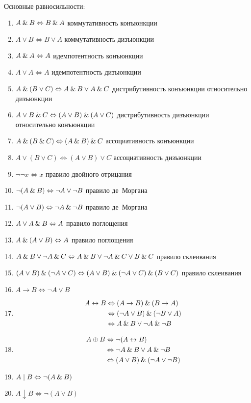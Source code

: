\documentclass[main]{subfiles}
\begin{document}
Основные равносильности:
\begin{enumerate}
    \item $A\mathbin{\&} B \Leftrightarrow B\mathbin{\&} A$ коммутативность конъюнкции
    \item $A\lor B \Leftrightarrow B\lor A$ коммутативность дизъюнкции
    \item $A\mathbin{\&} A \Leftrightarrow A$ идемпотентность конъюнкции
    \item $A\lor A \Leftrightarrow  A$ идемпотентность дизъюнкции
    \item $A\mathbin{\&}(B\lor C) \Leftrightarrow  A\mathbin{\&} B \lor A\mathbin{\&} C$ дистрибутивность конъюнкции относительно дизъюнкции
    \item $A\lor B\mathbin{\&} C  \Leftrightarrow (A\lor B)\mathbin{\&} (A\lor C)$ дистрибутивность дизъюнкции относительно конъюнкции
    \item $A\mathbin{\&} (B\mathbin{\&} C) \Leftrightarrow (A\mathbin{\&} B)\mathbin{\&} C$ ассоциативность конъюнкции
    \item $A\lor (B\lor C) \Leftrightarrow  (A\lor B)\lor C$ ассоциативность дизъюнкции
    \item $\lnot\lnot x \Leftrightarrow x$ правило двойного отрицания
    \item $\lnot(A\mathbin{\&} B) \Leftrightarrow \lnot A \lor \lnot B$ правило де~Моргана
    \item $\lnot(A\lor B) \Leftrightarrow  \lnot A \mathbin{\&} \lnot B$ правило де~Моргана
    \item $A\lor A \mathbin{\&} B \Leftrightarrow  A$ правило поглощения
    \item $A\mathbin{\&}(A\lor B) \Leftrightarrow  A$ правило поглощения
    \item $A\mathbin{\&} B \lor \lnot A\mathbin{\&} C \Leftrightarrow  A\mathbin{\&} B \lor \lnot A \mathbin{\&} C \lor B\mathbin{\&} C $ правило склеивания
    \item $(A\lor B) \mathbin{\&} (\lnot A \lor C) \Leftrightarrow  (A\lor B) \mathbin{\&} (\lnot A \lor C) \mathbin{\&} (B\lor C)$ правило склеивания
    \item $A\to B \Leftrightarrow \lnot A \lor B$
    \item
          \begin{align*}
              A\leftrightarrow B & \Leftrightarrow (A\to B) \mathbin{\&} (B\to A)                \\
                                 & \Leftrightarrow (\lnot A\lor B) \mathbin{\&} (\lnot B \lor A) \\
                                 & \Leftrightarrow A\mathbin{\&} B \lor \lnot A \mathbin{\&} \lnot B
          \end{align*}
    \item
          \begin{align*}
              A\oplus B & \Leftrightarrow \lnot(A \leftrightarrow B)            \\
                        & \Leftrightarrow \lnot A\mathbin{\&} B \lor A \mathbin{\&} \lnot B     \\
                        & \Leftrightarrow (A\lor B) \mathbin{\&} (\lnot A \lor \lnot B)
          \end{align*}
    \item $A \mid B \Leftrightarrow  \lnot(A \mathbin{\&} B)$
    \item $A \downarrow B \Leftrightarrow \lnot (A\lor B)$
\end{enumerate}
\end{document}
